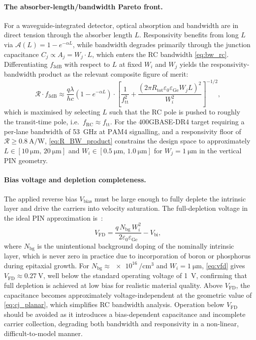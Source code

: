 \paragraph{The absorber-length/bandwidth Pareto front.}
For a waveguide-integrated detector, optical absorption and bandwidth are in
direct tension through the absorber length $L$. Responsivity benefits from
long $L$ via $\mathcal{A}(L) = 1 - e^{-\alpha L}$, while bandwidth degrades
primarily through the junction capacitance $C_j \propto A_j = W_j \cdot L$,
which enters the RC bandwidth \cref{eq:bw_rc}. Differentiating
$f_{3\mathrm{dB}}$ with respect to $L$ at fixed $W_i$ and $W_j$ yields the
responsivity-bandwidth product as the relevant composite figure of merit:
\begin{equation}
    \mathcal{R}\cdot f_{3\mathrm{dB}}
    \approx \frac{q\lambda}{hc}\!\left(1-e^{-\alpha L}\right)
    \cdot\left[\frac{1}{f_{\mathrm{tt}}^2}
    + \frac{(2\pi R_{\mathrm{tot}}\varepsilon_0\varepsilon_{\mathrm{Ge}}W_j L)^2}
           {W_i^2}\right]^{-1/2},
    \label{eq:R_BW_product}
\end{equation}
which is maximised by selecting $L$ such that the RC pole is pushed to roughly
the transit-time pole, i.e.\ $f_{\mathrm{RC}} \approx f_{\mathrm{tt}}$. For the
400GBASE-DR4 target requiring a per-lane bandwidth of \SI{53}{\giga\hertz} at
$\mathrm{PAM4}$ signalling, and a responsivity floor of
$\mathcal{R} \geq \SI{0.8}{\ampere\per\watt}$, \cref{eq:R_BW_product} constrains
the design space to approximately $L\in[\SI{10}{\micro\metre},\,\SI{20}{\micro\metre}]$
and $W_i\in[\SI{0.5}{\micro\metre},\,\SI{1.0}{\micro\metre}]$ for
$W_j = \SI{1}{\micro\metre}$ in the vertical PIN geometry.

\paragraph{Bias voltage and depletion completeness.}
The applied reverse bias $V_{\mathrm{bias}}$ must be large enough to fully
deplete the intrinsic layer and drive the carriers into velocity saturation.
The full-depletion voltage in the ideal PIN approximation is~\cite{SzeNg2006}:
\begin{equation}
    V_{\mathrm{FD}}
    = \frac{q\,N_{\mathrm{bg}}\,W_i^2}{2\varepsilon_0\varepsilon_{\mathrm{Ge}}} - V_{\mathrm{bi}},
    \label{eq:vfd}
\end{equation}
where $N_{\mathrm{bg}}$ is the unintentional background doping of the nominally
intrinsic layer, which is never zero in practice due to incorporation of boron or
phosphorus during epitaxial growth. For $N_{\mathrm{bg}} \approx
\SI{e16}{\per\centi\metre\cubed}$ and $W_i = \SI{1}{\micro\metre}$,
\cref{eq:vfd} gives $V_{\mathrm{FD}} \approx \SI{0.27}{\volt}$, well below
the standard operating voltage of \SI{1}{\volt}, confirming that full depletion
is achieved at low bias for realistic material quality. Above $V_{\mathrm{FD}}$,
the capacitance becomes approximately voltage-independent at the geometric value
of \cref{eq:cj_planar}, which simplifies RC bandwidth analysis. Operation below
$V_{\mathrm{FD}}$ should be avoided as it introduces a bias-dependent capacitance
and incomplete carrier collection, degrading both bandwidth and responsivity in a
non-linear, difficult-to-model manner.

